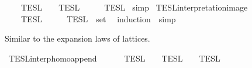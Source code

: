 \begin{isabellebody}
\ \ {\isacartoucheopen}{\isasymlbrakk}\ {\isasymphi}\ {\isasymrbrakk}\isactrlsub T\isactrlsub E\isactrlsub S\isactrlsub L\ {\isasyminter}\ {\isasymlbrakk}{\isasymlbrakk}\ {\isasymPhi}\ {\isasymrbrakk}{\isasymrbrakk}\isactrlsub T\isactrlsub E\isactrlsub S\isactrlsub L\ {\isacharequal}\ {\isasymlbrakk}{\isasymlbrakk}\ {\isasymphi}\ {\isacharhash}\ {\isasymPhi}\ {\isasymrbrakk}{\isasymrbrakk}\isactrlsub T\isactrlsub E\isactrlsub S\isactrlsub L{\isacartoucheclose}\isanewline
%
\isadelimproof
%
\endisadelimproof
%
\isatagproof
{}\isamarkupfalse%
\ simp%
\endisatagproof
{\isafoldproof}%
%
\isadelimproof
%
\endisadelimproof
%
\isadelimdocument
%
\endisadelimdocument
%
\isatagdocument
%
\isamarkuptrue%
%
\endisatagdocument
{\isafolddocument}%
%
\isadelimdocument
%
\endisadelimdocument
{}\isamarkupfalse%
\ TESL{\isacharunderscore}interpretation{\isacharunderscore}image{\isacharcolon}\isanewline
\ \ {\isacartoucheopen}{\isasymlbrakk}{\isasymlbrakk}\ {\isasymPhi}\ {\isasymrbrakk}{\isasymrbrakk}\isactrlsub T\isactrlsub E\isactrlsub S\isactrlsub L\ {\isacharequal}\ {\isasymInter}\ {\isacharparenleft}{\isacharparenleft}{\isasymlambda}{\isasymphi}{\isachardot}\ {\isasymlbrakk}\ {\isasymphi}\ {\isasymrbrakk}\isactrlsub T\isactrlsub E\isactrlsub S\isactrlsub L{\isacharparenright}\ {\isacharbackquote}\ set\ {\isasymPhi}{\isacharparenright}{\isacartoucheclose}\isanewline
%
\isadelimproof
%
\endisadelimproof
%
\isatagproof
{}\isamarkupfalse%
\ {\isacharparenleft}induction\ {\isasymPhi}{\isacharcomma}\ simp{\isacharplus}{\isacharparenright}%
\endisatagproof
{\isafoldproof}%
%
\isadelimproof
%
\endisadelimproof
%
\isadelimdocument
%
\endisadelimdocument
%
\isatagdocument
%
\isamarkuptrue%
%
\endisatagdocument
{\isafolddocument}%
%
\isadelimdocument
%
\endisadelimdocument
%
\begin{isamarkuptext}%
Similar to the expansion laws of lattices.%
\end{isamarkuptext}\isamarkuptrue%
\isamarkupfalse%
\ TESL{\isacharunderscore}interp{\isacharunderscore}homo{\isacharunderscore}append{\isacharcolon}\isanewline
\ \ {\isacartoucheopen}{\isasymlbrakk}{\isasymlbrakk}\ {\isasymPhi}\ {\isacharat}\ {\isasymPhi}\ {\isasymrbrakk}{\isasymrbrakk}\isactrlsub T\isactrlsub E\isactrlsub S\isactrlsub L\ {\isacharequal}\ {\isasymlbrakk}{\isasymlbrakk}\ {\isasymPhi}\ {\isasymrbrakk}{\isasymrbrakk}\isactrlsub T\isactrlsub E\isactrlsub S\isactrlsub L\ {\isasyminter}\ {\isasymlbrakk}{\isasymlbrakk}\ {\isasymPhi}\ {\isasymrbrakk}{\isasymrbrakk}\isactrlsub T\isactrlsub E\isactrlsub S\isactrlsub L{\isacartoucheclose}\isanewline

\end{isabellebody}
